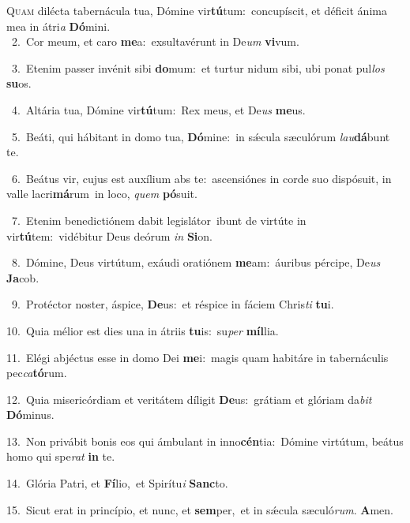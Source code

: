 \lettrine{\initial\textcolor{\initialcolor}{Q}}{uam} dilécta tabernácula tua, Dómine vir\-\textbf{tú}\-tum:~\star concupíscit, et déficit ánima mea in átri\textit{a} \textbf{Dó}\-mini.\\
{\numbfont\textcolor{\numbcolor}{~2.}}~Cor meum, et caro \textbf{me}\-a:~\star exsultavérunt in De\textit{um} \textbf{vi}\-vum.\par
{\numbfont\textcolor{\numbcolor}{~3.}}~Etenim passer invénit sibi \textbf{do}\-mum:~\star et turtur nidum sibi, ubi ponat pul\textit{los} \textbf{su}\-os.\par
{\numbfont\textcolor{\numbcolor}{~4.}}~Altária tua, Dómine vir\-\textbf{tú}\-tum:~\star Rex meus, et De\textit{us} \textbf{me}\-us.\par
{\numbfont\textcolor{\numbcolor}{~5.}}~Beáti, qui hábitant in domo tua, \textbf{Dó}\-mine:~\star in sǽcula sæculórum \textit{lau}\-\textbf{dá}bunt te.\par
{\numbfont\textcolor{\numbcolor}{~6.}}~Beátus vir, cujus est auxílium abs te:~\dagger ascensiónes in corde suo dispósuit, in valle lacri\-\textbf{má}\-rum~\star in loco, \textit{quem} \textbf{pó}\-suit.\par
{\numbfont\textcolor{\numbcolor}{~7.}}~Etenim benedictiónem dabit legislátor~\dagger ibunt de virtúte in vir\-\textbf{tú}\-tem:~\star vidébitur Deus deórum \textit{in} \textbf{Si}\-on.\par
{\numbfont\textcolor{\numbcolor}{~8.}}~Dómine, Deus virtútum, exáudi oratiónem \textbf{me}\-am:~\star áuribus pércipe, De\textit{us} \textbf{Ja}\-cob.\par
{\numbfont\textcolor{\numbcolor}{~9.}}~Protéctor noster, áspice, \textbf{De}\-us:~\star et réspice in fáciem Chris\textit{ti} \textbf{tu}\-i.\par
{\numbfont\textcolor{\numbcolor}{10.}}~Quia mélior est dies una in átriis \textbf{tu}\-is:~\star su\textit{per} \textbf{míl}\-lia.\par
{\numbfont\textcolor{\numbcolor}{11.}}~Elégi abjéctus esse in domo Dei \textbf{me}\-i:~\star magis quam habitáre in tabernáculis pec\-\textit{ca}\-\textbf{tó}rum.\par
{\numbfont\textcolor{\numbcolor}{12.}}~Quia misericórdiam et veritátem díligit \textbf{De}\-us:~\star grátiam et glóriam da\textit{bit} \textbf{Dó}\-minus.\par
{\numbfont\textcolor{\numbcolor}{13.}}~Non privábit bonis eos qui ámbulant in inno\-\textbf{cén}\-tia:~\star Dómine virtútum, beátus homo qui spe\textit{rat} \textbf{in} te.\par
{\numbfont\textcolor{\numbcolor}{14.}}~Glória Patri, et \textbf{Fí}\-lio,~\star et Spirítu\textit{i} \textbf{Sanc}\-to.\par
{\numbfont\textcolor{\numbcolor}{15.}}~Sicut erat in princípio, et nunc, et \textbf{sem}\-per,~\star et in sǽcula sæculó\-\textit{rum}\-. \textbf{A}\-men.\par
